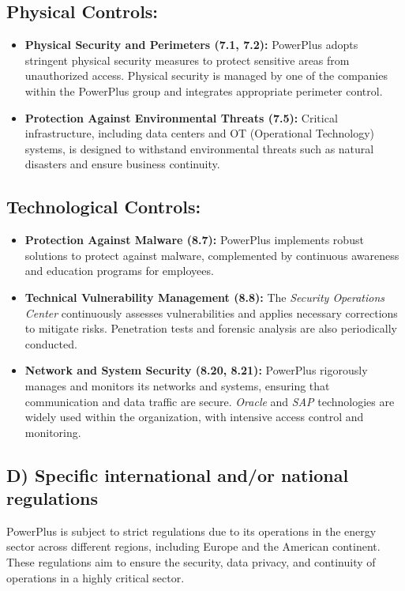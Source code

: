 \subsection*{Physical Controls:}

\begin{itemize}
    \item \textbf{Physical Security and Perimeters (7.1, 7.2):} PowerPlus adopts stringent physical security measures to protect sensitive areas from unauthorized access. Physical security is managed by one of the companies within the PowerPlus group and integrates appropriate perimeter control.
    \item \textbf{Protection Against Environmental Threats (7.5):} Critical infrastructure, including data centers and OT (Operational Technology) systems, is designed to withstand environmental threats such as natural disasters and ensure business continuity.
\end{itemize}

\subsection*{Technological Controls:}

\begin{itemize}
    \item \textbf{Protection Against Malware (8.7):} PowerPlus implements robust solutions to protect against malware, complemented by continuous awareness and education programs for employees.
    \item \textbf{Technical Vulnerability Management (8.8):} The \textit{Security Operations Center} continuously assesses vulnerabilities and applies necessary corrections to mitigate risks. Penetration tests and forensic analysis are also periodically conducted.
    \item \textbf{Network and System Security (8.20, 8.21):} PowerPlus rigorously manages and monitors its networks and systems, ensuring that communication and data traffic are secure. \textit{Oracle} and \textit{SAP} technologies are widely used within the organization, with intensive access control and monitoring.
\end{itemize}

\subsection*{D) Specific international and/or national regulations}
PowerPlus is subject to strict regulations due to its operations in the energy sector across different regions, including Europe and the American continent. These regulations aim to ensure the security, data privacy, and continuity of operations in a highly critical sector.

